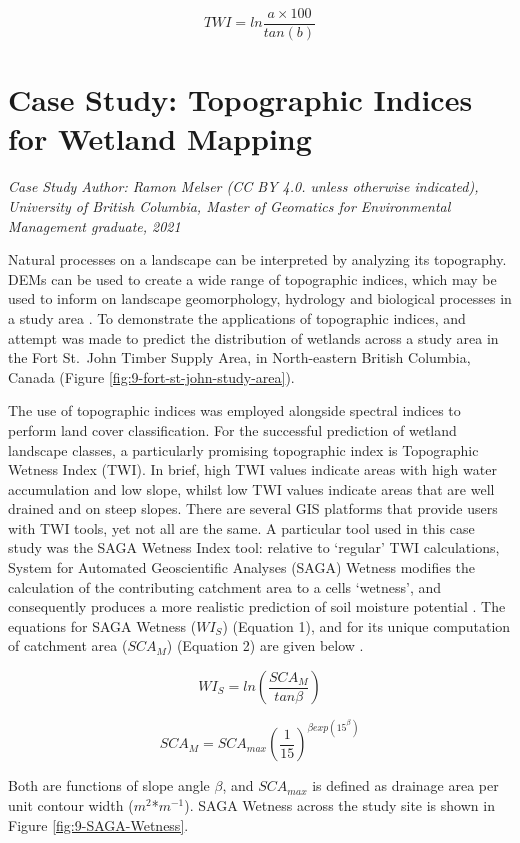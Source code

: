 \documentclass[
]{book}
\begin{document}
\[
TWI=ln\frac{a×100}{tan(b)}
\]

\hypertarget{case-study-topographic-indices-for-wetland-mapping}{%
\section{Case Study: Topographic Indices for Wetland Mapping}\label{case-study-topographic-indices-for-wetland-mapping}}

\emph{Case Study Author: Ramon Melser (CC BY 4.0. unless otherwise indicated), University of British Columbia, Master of Geomatics for Environmental Management graduate, 2021}

Natural processes on a landscape can be interpreted by analyzing its topography. DEMs can be used to create a wide range of topographic indices, which may be used to inform on landscape geomorphology, hydrology and biological processes in a study area \citep{mattivi_twi_2019}. To demonstrate the applications of topographic indices, and attempt was made to predict the distribution of wetlands across a study area in the Fort St.~John Timber Supply Area, in North-eastern British Columbia, Canada (Figure \ref{fig:9-fort-st-john-study-area}).

The use of topographic indices was employed alongside spectral indices to perform land cover classification. For the successful prediction of wetland landscape classes, a particularly promising topographic index is Topographic Wetness Index (TWI). In brief, high TWI values indicate areas with high water accumulation and low slope, whilst low TWI values indicate areas that are well drained and on steep slopes. There are several GIS platforms that provide users with TWI tools, yet not all are the same. A particular tool used in this case study was the SAGA Wetness Index tool: relative to `regular' TWI calculations, System for Automated Geoscientific Analyses (SAGA) Wetness modifies the calculation of the contributing catchment area to a cells `wetness', and consequently produces a more realistic prediction of soil moisture potential \citep{mattivi_twi_2019}. The equations for SAGA Wetness (\(WI_S\)) (Equation 1), and for its unique computation of catchment area (\(SCA_M\)) (Equation 2) are given below \citep{bohner_spatial_2006}.

\[
\tag{Equation 1} 
WI_S = ln (\frac{SCA_M}{tan\beta})
\]

\[
\tag{Equation 2}
SCA_M = SCA_{max} (\frac{1}{15})^{\beta exp(15^{\beta})}
\]

Both are functions of slope angle \(\beta\), and \(SCA_{max}\) is defined as drainage area per unit contour width (\(m^2\)*\(m^{-1}\)). SAGA Wetness across the study site is shown in Figure \ref{fig:9-SAGA-Wetness}.
\end{document}
